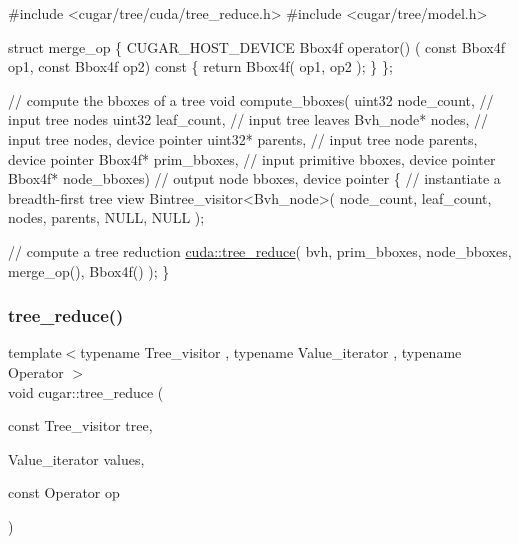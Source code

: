 \begin{DoxyCode}
\textcolor{preprocessor}{#include <cugar/tree/cuda/tree\_reduce.h>}
\textcolor{preprocessor}{#include <cugar/tree/model.h>}

\textcolor{keyword}{struct }merge\_op
\{
    CUGAR\_HOST\_DEVICE Bbox4f operator() (
        \textcolor{keyword}{const} Bbox4f op1,
        \textcolor{keyword}{const} Bbox4f op2)\textcolor{keyword}{ const }\{ \textcolor{keywordflow}{return} Bbox4f( op1, op2 ); \}
\};

\textcolor{comment}{// compute the bboxes of a tree}
\textcolor{keywordtype}{void} compute\_bboxes(
    uint32      node\_count,     \textcolor{comment}{// input tree nodes}
    uint32      leaf\_count,     \textcolor{comment}{// input tree leaves}
    Bvh\_node*   nodes,          \textcolor{comment}{// input tree nodes, device pointer}
    uint32*     parents,        \textcolor{comment}{// input tree node parents, device pointer}
    Bbox4f*     prim\_bboxes,    \textcolor{comment}{// input primitive bboxes, device pointer}
    Bbox4f*     node\_bboxes)    \textcolor{comment}{// output node bboxes, device pointer}
\{
    \textcolor{comment}{// instantiate a breadth-first tree view}
    Bintree\_visitor<Bvh\_node>(
        node\_count,
        leaf\_count,
        nodes,
        parents,
        NULL,
        NULL );

    \textcolor{comment}{// compute a tree reduction}
    \hyperlink{group___trees_module_ga8044d04a72e3a0a2bf628bbfc237f954}{cuda::tree\_reduce}(
        bvh,
        prim\_bboxes,
        node\_bboxes,
        merge\_op(),
        Bbox4f() );
\}
\end{DoxyCode}
 \mbox{\label{group___trees_module_ga808e7cb4b98d8dc0c3ef125ca457cb68}} 
\subsubsection{\texorpdfstring{tree\+\_\+reduce()}{tree\_reduce()}\hspace{0.1cm}{\footnotesize\ttfamily [3/4]}}
{\footnotesize\ttfamily template$<$typename Tree\+\_\+visitor , typename Value\+\_\+iterator , typename Operator $>$ \\
void cugar\+::tree\+\_\+reduce (\begin{DoxyParamCaption}\item[{const Tree\+\_\+visitor}]{tree,  }\item[{Value\+\_\+iterator}]{values,  }\item[{const Operator}]{op }\end{DoxyParamCaption})}

